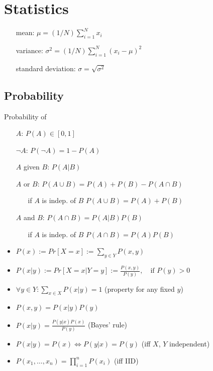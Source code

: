 \section*{Statistics}
\begin{itemize}
\item [mean:] $\mu = (1/N) \sum_{i=1}^N x_i$
\item [variance:] $\sigma^2 = (1/N) \sum_{i=1}^N (x_i-\mu)^2$
\item [standard deviation:] $\sigma = \sqrt{\sigma^2}$
\end{itemize}

\subsection*{Probability}
Probability of
\begin{itemize}
\item [$A$:] $P(A) \in [0,1]$
\item [$\neg A$:] $P(\neg A) = 1 - P(A)$
\item [$A$ given $B$:] $P(A\vert B) $
\item [$A$ or $B$:] $P(A\cup B) = P(A) + P(B) - P(A\cap B)$
\begin{itemize}
  \item[if $A$ is indep. of $B$] $P(A\cup B) = P(A) + P(B)$
\end{itemize}
\item [$A$ and $B$:] $P(A\cap B) = P(A\vert B)P(B)$
\begin{itemize}
  \item[if $A$ is indep. of $B$] $P(A\cap B) = P(A)P(B)$
\end{itemize}
\item $P(x) := Pr[X = x] := \sum_{y \in Y} P(x, y)$
\item $P(x|y) := Pr[X = x | Y = y] := \frac{P(x,y)}{P(y)},\quad \text{if } P(y) > 0$
\item $\forall y \in Y: \sum_{x \in X} P(x|y) = 1$ (property for any fixed $y$)
\item $P(x, y) = P(x|y) P(y)$
\item $P(x|y) = \frac{P(y|x)P(x)}{P(y)}$ (Bayes' rule)
\item $P(x|y) = P(x) \Leftrightarrow P(y|x) = P(y)$ (iff $X$, $Y$ independent)
\item $P(x_1, \ldots, x_n) = \prod_{i=1}^n P(x_i)$ (iff IID)
\end{itemize}
